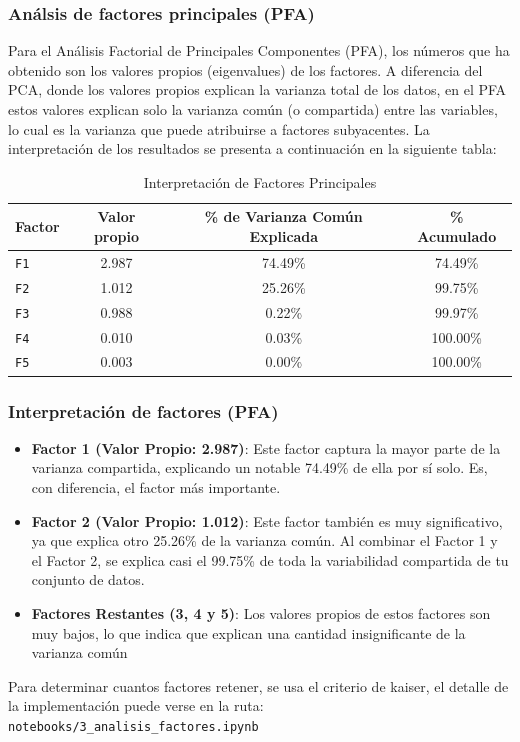 \documentclass[journal]{IEEEtran}
\begin{document}
	\subsubsection{Análsis de factores principales (PFA)}
	Para el Análisis Factorial de Principales Componentes (PFA), los números que ha obtenido son los valores propios (eigenvalues) de los factores. A diferencia del PCA, donde los valores propios explican la varianza total de los datos, en el PFA estos valores explican solo la varianza común (o compartida) entre las variables, lo cual es la varianza que puede atribuirse a factores subyacentes.
	La interpretación de los resultados se presenta a continuación en la siguiente tabla:
	\begin{table}[H]
		\centering
		\caption{Interpretación de Factores Principales}
		\begin{tabular}{l c c c}
			\toprule
			Factor & Valor propio & \% de Varianza Común Explicada & \% Acumulado	 \\
			\midrule
			\texttt{F1} & 2.987 &    74.49\% & 74.49\%  \\
			\texttt{F2} & 1.012 &    25.26\% & 99.75\%  \\
			\texttt{F3} & 0.988 &    0.22\%  & 99.97\%   \\
			\texttt{F4} & 0.010 &    0.03\%  & 100.00\%   \\
			\texttt{F5} & 0.003 &    0.00\%  & 100.00\%  \\
			\bottomrule
		\end{tabular}
		\label{tab:pca_results}
	\end{table}
	\subsubsection{Interpretación de factores (PFA)}
	\begin{itemize}
		\item \textbf{Factor 1 (Valor Propio: 2.987)}: Este factor captura la mayor parte de la varianza compartida, explicando un notable 74.49\% de ella por sí solo. Es, con diferencia, el factor más importante.
		\item \textbf{Factor 2 (Valor Propio: 1.012)}: Este factor también es muy significativo, ya que explica otro 25.26\% de la varianza común. Al combinar el Factor 1 y el Factor 2, se explica casi el 99.75\% de toda la variabilidad compartida de tu conjunto de datos.
		\item \textbf{Factores Restantes (3, 4 y 5)}: Los valores propios de estos factores son muy bajos, lo que indica que explican una cantidad insignificante de la varianza común
	\end{itemize}
	Para determinar cuantos factores retener, se usa el criterio de kaiser, el detalle de la implementación puede verse en la ruta: \texttt{notebooks/3\_analisis\_factores.ipynb}
\end{document}
